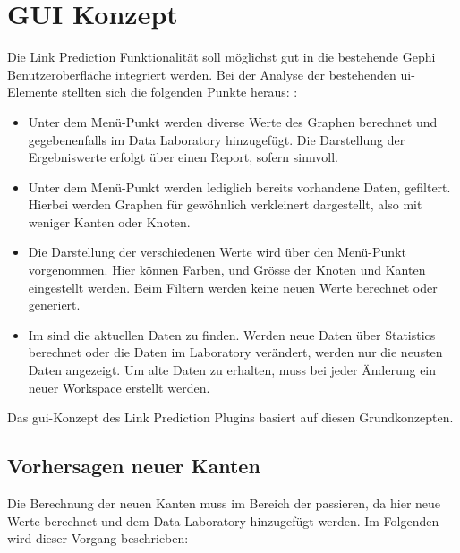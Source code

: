 \section{GUI Konzept}

Die Link Prediction Funktionalität soll möglichst gut in die bestehende Gephi Benutzeroberfläche integriert werden.
Bei der Analyse der bestehenden \acs{ui}-Elemente stellten sich die folgenden Punkte heraus:
:

\begin{itemize}
    \item Unter dem Menü-Punkt  werden diverse Werte des Graphen berechnet und gegebenenfalls im Data Laboratory
          hinzugefügt. Die Darstellung der Ergebniswerte erfolgt über einen Report, sofern sinnvoll.
    \item Unter dem Menü-Punkt  werden lediglich bereits vorhandene Daten, gefiltert. Hierbei werden Graphen für gewöhnlich verkleinert dargestellt, also mit weniger Kanten oder Knoten.
    \item Die Darstellung der verschiedenen Werte wird über den Menü-Punkt  vorgenommen. Hier können Farben,
          und Grösse der Knoten und Kanten eingestellt werden. Beim Filtern werden keine neuen Werte berechnet oder generiert.
    \item Im  sind die aktuellen Daten zu finden. Werden neue Daten über Statistics berechnet
          oder die Daten im Laboratory verändert, werden nur die neusten Daten angezeigt. Um alte Daten zu erhalten,
          muss bei jeder Änderung ein neuer Workspace erstellt werden.
\end{itemize}

Das \acs{gui}-Konzept des Link Prediction Plugins basiert auf diesen Grundkonzepten.

\subsection{Vorhersagen neuer Kanten}

Die Berechnung der neuen Kanten muss im Bereich der  passieren, da hier neue Werte berechnet und dem
Data Laboratory hinzugefügt werden. Im Folgenden wird dieser Vorgang beschrieben:

